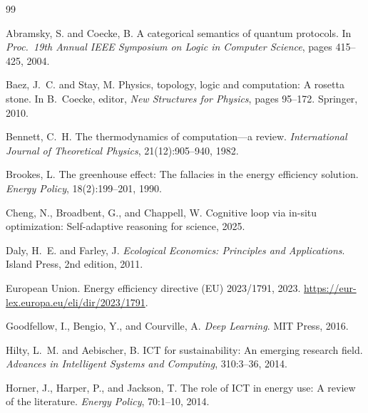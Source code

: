 \documentclass[11pt,a4paper]{article}
\theoremstyle{plain}
\theoremstyle{definition}
\theoremstyle{remark}
\begin{document}
\newpage

\begin{thebibliography}{99}

Abramsky, S. and Coecke, B.
\newblock A categorical semantics of quantum protocols.
\newblock In \emph{Proc.\ 19th Annual IEEE Symposium on Logic in Computer
  Science}, pages 415--425, 2004.

Baez, J.~C. and Stay, M.
\newblock Physics, topology, logic and computation: A rosetta stone.
\newblock In B.~Coecke, editor, \emph{New Structures for Physics}, pages
  95--172. Springer, 2010.

Bennett, C.~H.
\newblock The thermodynamics of computation---a review.
\newblock \emph{International Journal of Theoretical Physics},
  21(12):905--940, 1982.

Brookes, L.
\newblock The greenhouse effect: The fallacies in the energy efficiency
  solution.
\newblock \emph{Energy Policy}, 18(2):199--201, 1990.

Cheng, N., Broadbent, G., and Chappell, W.
\newblock Cognitive loop via in-situ optimization: Self-adaptive reasoning for
  science, 2025.

Daly, H.~E. and Farley, J.
\newblock \emph{Ecological Economics: Principles and Applications}.
\newblock Island Press, 2nd edition, 2011.

European Union.
\newblock Energy efficiency directive (EU) 2023/1791, 2023.
\newblock \url{https://eur-lex.europa.eu/eli/dir/2023/1791}.

Goodfellow, I., Bengio, Y., and Courville, A.
\newblock \emph{Deep Learning}.
\newblock MIT Press, 2016.

Hilty, L.~M. and Aebischer, B.
\newblock ICT for sustainability: An emerging research field.
\newblock \emph{Advances in Intelligent Systems and Computing}, 310:3--36,
  2014.

Horner, J., Harper, P., and Jackson, T.
\newblock The role of ICT in energy use: A review of the literature.
\newblock \emph{Energy Policy}, 70:1--10, 2014.


\end{thebibliography}
\end{document}
